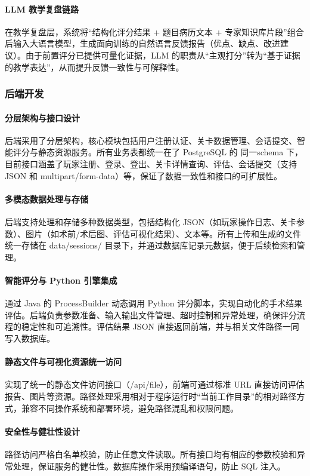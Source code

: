 \documentclass[12pt,a4paper]{ctexart}
\begin{document}
\paragraph{LLM 教学复盘链路}
在教学复盘层，系统将“结构化评分结果 + 题目病历文本 + 专家知识库片段”组合后输入大语言模型，生成面向训练的自然语言反馈报告（优点、缺点、改进建议）。由于前置评分已提供可量化证据，LLM 的职责从“主观打分”转为“基于证据的教学表达”，从而提升反馈一致性与可解释性。

\subsubsection{后端开发}

\paragraph{分层架构与接口设计}
后端采用了分层架构，核心模块包括用户注册认证、关卡数据管理、会话提交、智能评分与静态资源服务。所有业务表都统一在了 PostgreSQL 的 同一schema 下，目前接口涵盖了玩家注册、登录、登出、关卡详情查询、评估、会话提交（支持 JSON 和 multipart/form-data）等，保证了数据一致性和接口的可扩展性。 

\paragraph{多模态数据处理与存储}
后端支持处理和存储多种数据类型，包括结构化 JSON（如玩家操作日志、关卡参数）、图片（如术前/术后图、评估可视化结果）、文本等。所有上传和生成的文件统一存储在 data/sessions/ 目录下，并通过数据库记录元数据，便于后续检索和管理。
\paragraph{智能评分与 Python 引擎集成}
通过 Java 的 ProcessBuilder 动态调用 Python 评分脚本，实现自动化的手术结果评估。后端负责参数准备、输入输出文件管理、超时控制和异常处理，确保评分流程的稳定性和可追溯性。评估结果 JSON 直接返回前端，并与相关文件路径一同写入数据库。
\paragraph{静态文件与可视化资源统一访问}
实现了统一的静态文件访问接口（/api/file），前端可通过标准 URL 直接访问评估报告、图片等资源。路径处理采用相对于程序运行时“当前工作目录”的相对路径方式，兼容不同操作系统和部署环境，避免路径混乱和权限问题。
\paragraph{安全性与健壮性设计}
路径访问严格白名单校验，防止任意文件读取。所有接口均有相应的参数校验和异常处理，保证服务的健壮性。数据库操作采用预编译语句，防止 SQL 注入。
\end{document}
